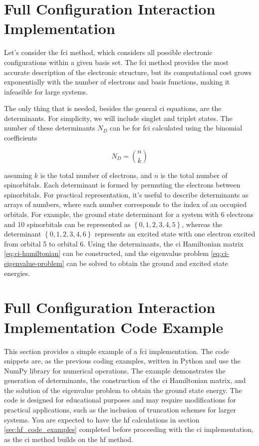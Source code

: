 \section{Full Configuration Interaction Implementation}

Let's consider the \acrshort{fci} method, which considers all possible electronic configurations within a given basis set. The \acrshort{fci} method provides the most accurate description of the electronic structure, but its computational cost grows exponentially with the number of electrons and basis functions, making it infeasible for large systems.

The only thing that is needed, besides the general \acrshort{ci} equations, are the determinants. For simplicity, we will include singlet and triplet states. The number of these determinants \(N_D\) can be for \acrshort{fci} calculated using the binomial coefficients

\begin{equation}
N_D=\binom{n}{k}
\end{equation}

assuming \(k\) is the total number of electrons, and \(n\) is the total number of spinorbitals. Each determinant is formed by permuting the electrons between spinorbitals. For practical representation, it's useful to describe determinants as arrays of numbers, where each number corresponds to the index of an occupied orbitals. For example, the ground state determinant for a system with 6 electrons and 10 spinorbitals can be represented as \(\left\lbrace 0,1,2,3,4,5\right\rbrace\), whereas the determinant \(\left\lbrace 0,1,2,3,4,6\right\rbrace\) represents an excited state with one electron excited from orbital 5 to orbital 6. Using the determinants, the \acrshort{ci} Hamiltonian matrix \ref{eq:ci-hamiltonian} can be constructed, and the eigenvalue problem \ref{eq:ci-eigenvalue-problem} can be solved to obtain the ground and excited state energies.

\section{Full Configuration Interaction Implementation Code Example}

This section provides a simple example of a \acrshort{fci} implementation. The code snippets are, as the previous coding examples, written in Python and use the NumPy library for numerical operations. The example demonstrates the generation of determinants, the construction of the \acrshort{ci} Hamiltonian matrix, and the solution of the eigenvalue problem to obtain the ground state energy. The code is designed for educational purposes and may require modifications for practical applications, such as the inclusion of truncation schemes for larger systems. You are expected to have the \acrshort{hf} calculations in section \ref{sec:hf_code_examples} completed before proceeding with the \acrshort{ci} implementation, as the \acrshort{ci} method builds on the \acrshort{hf} method.

